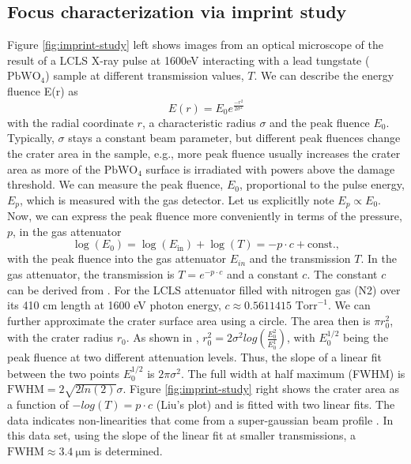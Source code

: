 \subsection{Focus characterization via imprint study}
%
Figure \ref{fig:imprint-study} left shows images from an optical microscope of the result of a LCLS X-ray pulse at 1600eV interacting with a lead tungstate ($\text{PbWO}_{4}$) sample at different transmission values, $T$. We can describe the energy fluence E(r) as
\begin{equation}
E(r) = E_{0} e^{\frac{-r^{2}}{2 \sigma^{2}}} 
\end{equation}
with the radial coordinate $r$, a characteristic radius $\sigma$ and the peak fluence $E_{0}$. Typically, $\sigma$ stays a constant beam parameter, but different peak fluences change the crater area in the sample, e.g., more peak fluence usually increases the crater area as more of the $\text{PbWO}_{4}$ surface is irradiated with powers above the damage threshold. We can measure the peak fluence, $E_{0}$, proportional to the pulse energy, $E_{p}$, which is measured with the gas detector. Let us explicitlly note $E_{p}\propto E_{0}$. Now, we can express the peak fluence more conveniently in terms of the pressure, $p$, in the gas attenuator
\begin{equation}
\log(E_{0}) = \log(E_{\text{in}})+\log(T)= -p \cdot c + \text{const.},
\label{eq:gaussian-beam-imprint}
\end{equation}
with the peak fluence into the gas attenuator $E_{in}$ and the transmission $T$. In the gas attenuator, the transmission is $T=e^{-p \cdot c}$ and a constant $c$. The constant $c$ can be derived from \citep{Henke-1993-ADNDT}. For the LCLS attenuator filled with nitrogen gas (N2) over its 410 cm length at 1600 eV photon energy, $c\approx 0.5611415 \text{ Torr}^{-1}$. We can further approximate the crater surface area using a circle. The area then is $\pi r_{0}^{2}$, with the crater radius $r_{0}$. As shown in \citep{Liu-1982-OptLett}, $r_{0}^{2}=2\sigma^{2}log(\frac{E_{0}^{2}}{E_{0}^{1}})$, with $E_{0}^{1/2}$ being the peak fluence at two different attenuation levels. Thus, the slope of a linear fit between the two points $E_{0}^{1/2}$ is $2 \pi \sigma^{2}$. The full width at half maximum (FWHM) is $\text{FWHM}=2\sqrt{2 ln(2)}\sigma$. Figure \ref{fig:imprint-study} right shows the crater area as a function of $-log(T)= p \cdot c$ (Liu's plot) and is fitted with two linear fits. The data indicates non-linearities that come from a super-gaussian beam profile \citep{Chalupsky-2010-OE,Chalupsky-2013-OE}. In this data set, using the slope of the linear fit at smaller transmissions, a $\text{FWHM}\approx \SI{3.4}{\micro\meter}$ is determined.\\[1\baselineskip]
